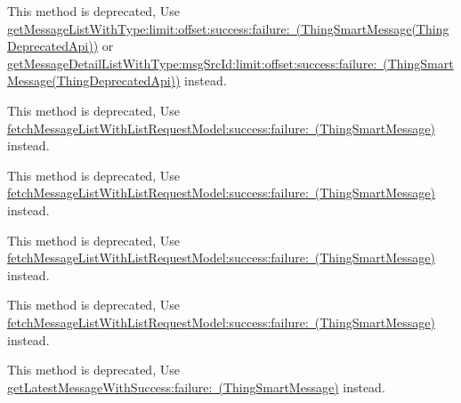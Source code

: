 \begin{DoxyRefList}
\label{deprecated__deprecated000188}%
%
This method is deprecated, Use \mbox{\hyperlink{category_thing_smart_message_07_thing_deprecated_api_08_ada5616d3a613a6453fe4208ef875df7a}{get\+Message\+List\+With\+Type\+:limit\+:offset\+:success\+:failure\+: (\+Thing\+Smart\+Message(\+Thing\+Deprecated\+Api))}} or \mbox{\hyperlink{category_thing_smart_message_07_thing_deprecated_api_08_a63f107a2e407d2a7bd110b38b716129b}{get\+Message\+Detail\+List\+With\+Type\+:msg\+Src\+Id\+:limit\+:offset\+:success\+:failure\+: (\+Thing\+Smart\+Message(\+Thing\+Deprecated\+Api))}} instead.  
\item[(Thing\+Deprecated\+Api) Member \mbox{\hyperlink{category_thing_smart_message_07_thing_deprecated_api_08_ada5616d3a613a6453fe4208ef875df7a}{\mbox{[}Thing\+Smart\+Message(Thing\+Deprecated\+Api) get\+Message\+List\+With\+Type\+:limit\+:offset\+:success\+:failure\+:\mbox{]}}} ]\label{deprecated__deprecated000178}%
%
This method is deprecated, Use \mbox{\hyperlink{interface_thing_smart_message_a129e5acf0bc8bb06f316e6aa5f2db958}{fetch\+Message\+List\+With\+List\+Request\+Model\+:success\+:failure\+: (\+Thing\+Smart\+Message)}} instead. 

\label{deprecated__deprecated000185}%
%
This method is deprecated, Use \mbox{\hyperlink{interface_thing_smart_message_a129e5acf0bc8bb06f316e6aa5f2db958}{fetch\+Message\+List\+With\+List\+Request\+Model\+:success\+:failure\+: (\+Thing\+Smart\+Message)}} instead. 

\label{deprecated__deprecated000171}%
%
This method is deprecated, Use \mbox{\hyperlink{interface_thing_smart_message_a129e5acf0bc8bb06f316e6aa5f2db958}{fetch\+Message\+List\+With\+List\+Request\+Model\+:success\+:failure\+: (\+Thing\+Smart\+Message)}} instead. 

\label{deprecated__deprecated000192}%
%
This method is deprecated, Use \mbox{\hyperlink{interface_thing_smart_message_a129e5acf0bc8bb06f316e6aa5f2db958}{fetch\+Message\+List\+With\+List\+Request\+Model\+:success\+:failure\+: (\+Thing\+Smart\+Message)}} instead.  
\item[(Thing\+Deprecated\+Api) Member \mbox{\hyperlink{category_thing_smart_message_07_thing_deprecated_api_08_a73d67e5deaf9d87f6af4d7a5ba0037e8}{\mbox{[}Thing\+Smart\+Message(Thing\+Deprecated\+Api) get\+Message\+Max\+Time\+:failure\+:\mbox{]}}} ]\label{deprecated__deprecated000176}%
%
This method is deprecated, Use \mbox{\hyperlink{interface_thing_smart_message_a004b181c6a0820da778c59f4564685e0}{get\+Latest\+Message\+With\+Success\+:failure\+: (\+Thing\+Smart\+Message)}} instead. 


\end{DoxyRefList}
